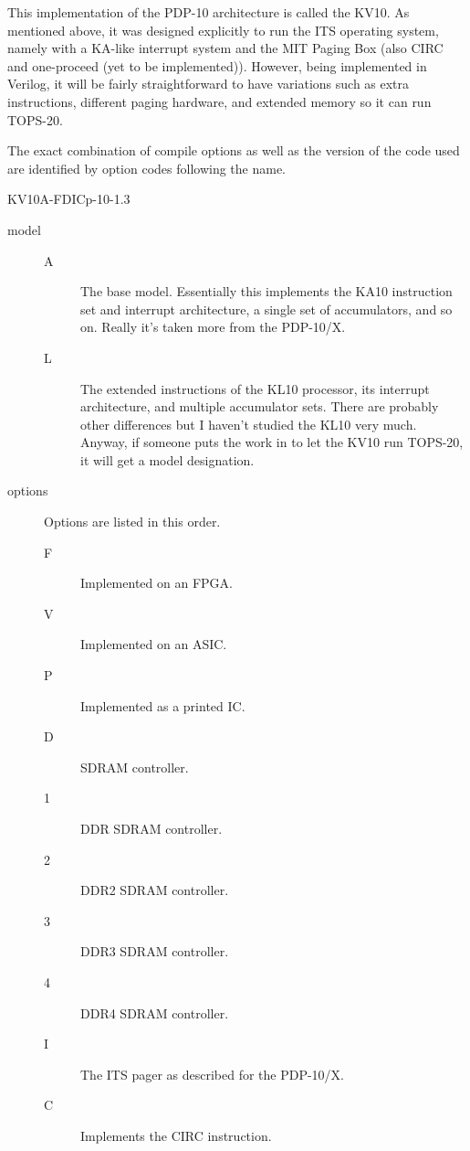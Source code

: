 \documentclass[12pt]{report}
\newcommand{\code}[1]{\textsf{#1}}
\begin{document}
This implementation of the PDP-10 architecture is called the KV10. As mentioned above, it
was designed explicitly to run the ITS operating system, namely with a KA-like interrupt
system and the MIT Paging Box (also \code{CIRC} and one-proceed (yet to be
implemented)). However, being implemented in Verilog, it will be fairly
straightforward to have variations such as extra instructions, different paging hardware,
and extended memory so it can run TOPS-20.

The exact combination of compile options as well as the version of the code used are 
identified by option codes following the name.

\begin{center} \large KV10A-FDICp-10-1.3 \end{center}

\begin{description}
  \item[model] \hfill
    \begin{description}
      \item[A] The base model.  Essentially this implements the KA10 instruction set and
        interrupt architecture, a single set of accumulators, and so on.  Really it's
        taken more from the PDP-10/X.
      \item[L] The extended instructions of the KL10 processor, its interrupt
        architecture, and multiple accumulator sets.  There are probably other differences
        but I haven't studied the KL10 very much.  Anyway, if someone puts the work in to
        let the KV10 run TOPS-20, it will get a model designation.
    \end{description}
  \item[options] Options are listed in this order.
    \begin{description}
      \item[F] Implemented on an FPGA.
      \item[V] Implemented on an ASIC.
      \item[P] Implemented as a printed IC.
      \item[D] SDRAM controller.
      \item[1] DDR SDRAM controller.
      \item[2] DDR2 SDRAM controller.
      \item[3] DDR3 SDRAM controller.
      \item[4] DDR4 SDRAM controller.
      \item[I] The ITS pager as described for the PDP-10/X.
      \item[C] Implements the \code{CIRC} instruction.

\end{description}
\end{description}
\end{document}
